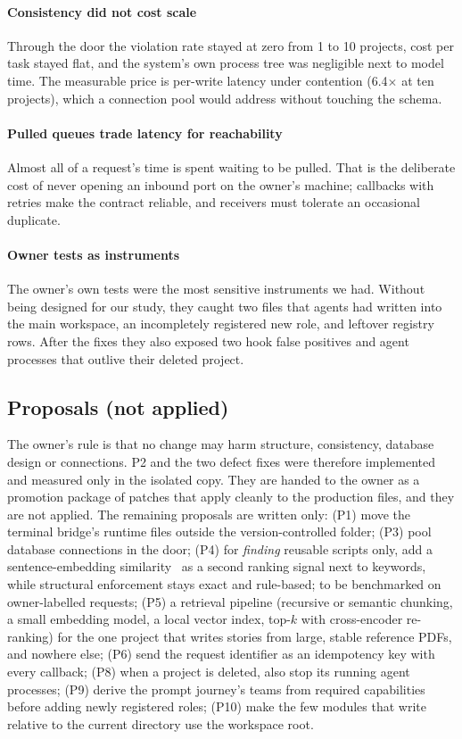 \paragraph*{Consistency did not cost scale} Through the door the violation rate stayed at zero from 1 to 10 projects, cost per task stayed flat, and the system's own process tree was negligible next to model time. The measurable price is per-write latency under contention (6.4$\times$ at ten projects), which a connection pool would address without touching the schema.

\paragraph*{Pulled queues trade latency for reachability} Almost all of a request's time is spent waiting to be pulled. That is the deliberate cost of never opening an inbound port on the owner's machine; callbacks with retries make the contract reliable, and receivers must tolerate an occasional duplicate.

\paragraph*{Owner tests as instruments} The owner's own tests were the most sensitive instruments we had. Without being designed for our study, they caught two files that agents had written into the main workspace, an incompletely registered new role, and leftover registry rows. After the fixes they also exposed two hook false positives and agent processes that outlive their deleted project.

\subsection{Proposals (not applied)}\label{sec:proposals}
The owner's rule is that no change may harm structure, consistency, database design or connections. P2 and the two defect fixes were therefore implemented and measured only in the isolated copy. They are handed to the owner as a promotion package of patches that apply cleanly to the production files, and they are not applied. The remaining proposals are written only:
(P1) move the terminal bridge's runtime files outside the version-controlled folder;
(P3) pool database connections in the door;
(P4) for \emph{finding} reusable scripts only, add a sentence-embedding similarity~\cite{reimers2019sbert,wang2020minilm} as a second ranking signal next to keywords, while structural enforcement stays exact and rule-based; to be benchmarked on owner-labelled requests;
(P5) a retrieval pipeline (recursive or semantic chunking, a small embedding model, a local vector index, top-$k$ with cross-encoder re-ranking) for the one project that writes stories from large, stable reference PDFs, and nowhere else;
(P6) send the request identifier as an idempotency key with every callback;
(P8) when a project is deleted, also stop its running agent processes;
(P9) derive the prompt journey's teams from required capabilities before adding newly registered roles;
(P10) make the few modules that write relative to the current directory use the workspace root.
